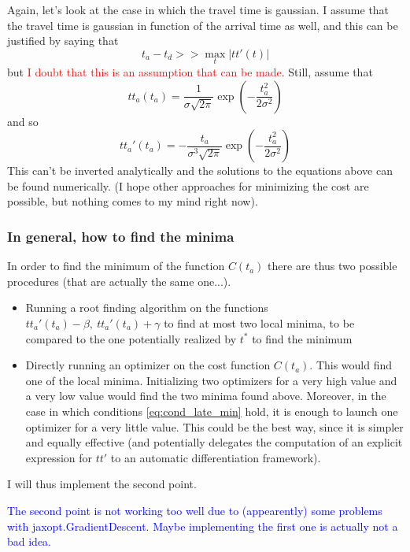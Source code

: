 \documentclass{article}
\begin{document}
Again, let's look at the case in which the travel time is gaussian.
I assume that the travel time is gaussian in function of the arrival time as well,
and this can be justified by saying that
\[t_a - t_d >> \max_t | tt'(t)|\]
but \textcolor{red}{I doubt that this is an assumption that can be made}.
Still, assume that
\begin{equation}
  \label{eq:travel_time_gauss}
  tt_a(t_a) = \frac{1}{\sigma\sqrt{2\pi}}\exp\left(-{\frac{t_a^2}{2\sigma^2}}\right)
\end{equation}
and so
\begin{equation}
  \label{eq:travel_time_gauss_diff}
  tt_a'(t_a) = -\frac{t_a}{\sigma^3\sqrt{2\pi}}\exp\left(-{\frac{t_a^2}{2\sigma^2}}\right)
\end{equation}
This can't be inverted analytically and the solutions to the equations above can be found numerically.
(I hope other approaches for minimizing the cost are possible, but nothing comes to my mind right now).

\subsubsection{In general, how to find the minima}


In order to find the minimum of the function \(C(t_a)\) there are thus two possible procedures (that are actually the same one...).
\begin{itemize}
\item Running a root finding algorithm on the functions \(tt_a'(t_a) - \beta,\ tt_a'(t_a) + \gamma\) to find at most two local minima, to be compared to the one potentially realized by \(t^*\) to find the minimum
\item Directly running an optimizer on the cost function \(C(t_a)\). This would find one of the local minima.
  Initializing two optimizers for a very high value and a very low value would find the two minima found above.
  Moreover, in the case in which conditions \eqref{eq:cond_late_min} hold,
  it is enough to launch one optimizer for a very little value.
  This could be the best way, since it is simpler and equally effective (and potentially delegates the computation of an explicit expression for \(tt'\) to an automatic differentiation framework).
\end{itemize}

I will thus implement the second point.

\textcolor{blue}{The second point is not working too well due to (appearently) some problems with jaxopt.GradientDescent. Maybe implementing the first one is actually not a bad idea.}
\end{document}
